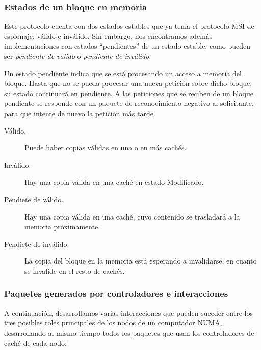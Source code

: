 \subsubsection{Estados de un bloque en memoria}
Este protocolo cuenta con dos estados estables que ya tenía el protocolo MSI de espionaje: válido e inválido. Sin embargo, nos encontramos además implementaciones con estados ``pendientes'' de un estado estable, como pueden ser \emph{pendiente de válido} o \emph{pendiente de inválido}. 

Un estado pendiente indica que se está procesando un acceso a memoria del bloque. Hasta que no se pueda procesar una nueva petición sobre dicho bloque, su estado continuará en pendiente. A las peticiones que se reciben de un bloque pendiente se responde con un paquete de reconocimiento negativo al solicitante, para que intente de nuevo la petición más tarde.
\begin{description}
    \item [Válido.] Puede haber copias válidas en una o en más cachés.
    \item [Inválido.] Hay una copia válida en una caché en estado Modificado.
    \item [Pendiete de válido.] Hay una copia válida en una caché, cuyo contenido se trasladará a la memoria próximamente.
    \item [Pendiete de inválido.] La copia del bloque en la memoria está esperando a invalidarse, en cuanto se invalide en el resto de cachés.
\end{description}

\subsubsection{Paquetes generados por controladores e interacciones}
A continuación, desarrollamos varias interacciones que pueden suceder entre los tres posibles roles principales de los nodos de un computador NUMA, desarrollando al mismo tiempo todos los paquetes que usan los controladores de caché de cada nodo:

